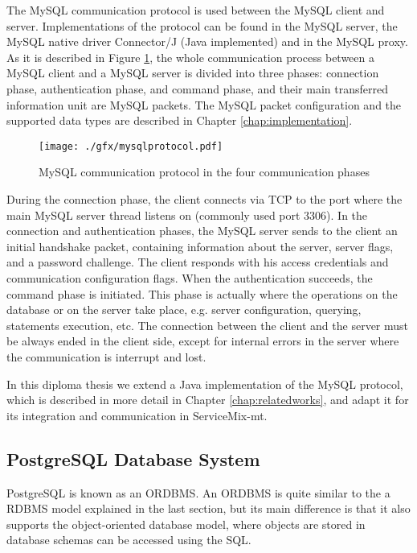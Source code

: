 The MySQL communication protocol is used between the MySQL client and server. Implementations of the protocol can be found in the MySQL server, the MySQL native driver Connector/J (Java implemented) and in the MySQL proxy. As it is described in Figure \ref{fig:mysqlprotocol}, the whole communication process between a MySQL client and a MySQL server is divided into three phases: connection phase, authentication phase, and command phase, and their main transferred information unit are MySQL packets. The MySQL packet configuration and the supported data types are described in Chapter \ref{chap:implementation}.

\begin{figure}[htb]
	\centering
		\texttt{[image: ./gfx/mysqlprotocol.pdf]}
	\caption[MySQL Communication Protocol]{MySQL communication protocol in the four communication phases \cite{mysqlmanual}}
	\label{fig:mysqlprotocol}
\end{figure}

During the connection phase, the client connects via \ac{TCP} to the port where the main MySQL server thread listens on (commonly used port 3306). In the connection and authentication phases, the MySQL server sends to the client an initial handshake packet, containing information about the server, server flags, and a password challenge. The client responds with his access credentials and communication configuration flags. When the authentication succeeds, the command phase is initiated. This phase is actually where the operations on the database or on the server take place, e.g. server configuration, querying, statements execution, etc. The connection between the client and the server must be always ended in the client side, except for internal errors in the server where the communication is interrupt and lost. 

In this diploma thesis we extend a Java implementation of the MySQL protocol, which is described in more detail in Chapter \ref{chap:relatedworks}, and adapt it for its integration and communication in ServiceMix-mt.

\subsection{PostgreSQL Database System}

PostgreSQL is known as an \ac{ORDBMS}. An \ac{ORDBMS} is quite similar to the a \ac{RDBMS} model explained in the last section, but its main difference is that it also supports the object-oriented database model, where objects are stored in database schemas can be accessed using the \ac{SQL}. 

